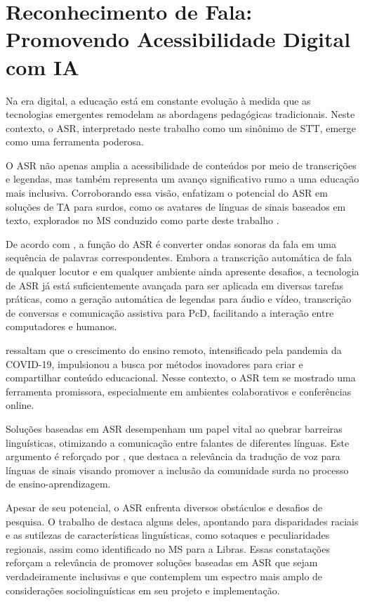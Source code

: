 \section{Reconhecimento de Fala: Promovendo Acessibilidade Digital com IA}
\label{section:foundation:asr}

Na era digital, a educação está em constante evolução à medida que as tecnologias emergentes remodelam as abordagens pedagógicas tradicionais. Neste contexto, o ASR, interpretado neste trabalho como um sinônimo de STT, emerge como uma ferramenta poderosa.

O ASR não apenas amplia a acessibilidade de conteúdos por meio de transcrições e legendas, mas também representa um avanço significativo rumo a uma educação mais inclusiva. Corroborando essa visão,  enfatizam o potencial do ASR em soluções de TA para surdos, como os avatares de línguas de sinais baseados em texto, explorados no MS conduzido como parte deste trabalho \cite{FalvoJr2020_FIE, FalvoJr2020_SBIE, FalvoJr2021_RENOTE}.

De acordo com , a função do ASR é converter ondas sonoras da fala em uma sequência de palavras correspondentes. Embora a transcrição automática de fala de qualquer locutor e em qualquer ambiente ainda apresente desafios, a tecnologia de ASR já está suficientemente avançada para ser aplicada em diversas tarefas práticas, como a geração automática de legendas para áudio e vídeo, transcrição de conversas e comunicação assistiva para PcD, facilitando a interação entre computadores e humanos.

 ressaltam que o crescimento do ensino remoto, intensificado pela pandemia da COVID-19, impulsionou a busca por métodos inovadores para criar e compartilhar conteúdo educacional. Nesse contexto, o ASR tem se mostrado uma ferramenta promissora, especialmente em ambientes colaborativos e conferências online.

Soluções baseadas em ASR desempenham um papel vital ao quebrar barreiras linguísticas, otimizando a comunicação entre falantes de diferentes línguas. Este argumento é reforçado por , que destaca a relevância da tradução de voz para línguas de sinais visando promover a inclusão da comunidade surda no processo de ensino-aprendizagem.

Apesar de seu potencial, o ASR enfrenta diversos obstáculos e desafios de pesquisa. O trabalho de  destaca alguns deles, apontando para disparidades raciais e as sutilezas de características linguísticas, como sotaques e peculiaridades regionais, assim como identificado no MS para a Libras. Essas constatações reforçam a relevância de promover soluções baseadas em ASR que sejam verdadeiramente inclusivas e que contemplem um espectro mais amplo de considerações sociolinguísticas em seu projeto e implementação.

